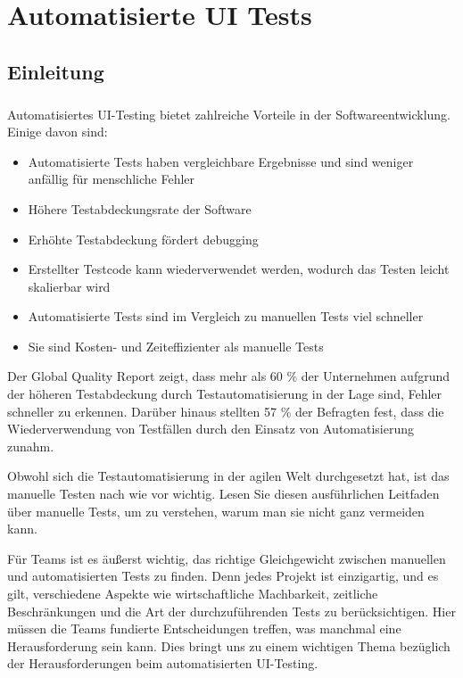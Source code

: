 \chapter{Automatisierte UI Tests}
	\section{Einleitung}  %
		\paragraph{} Automatisiertes UI-Testing bietet zahlreiche Vorteile in der Softwareentwicklung. Einige davon sind:
		
		\begin{itemize}
			\item Automatisierte Tests haben vergleichbare Ergebnisse und sind weniger anfällig für menschliche Fehler
			\item Höhere Testabdeckungsrate der Software
			\item Erhöhte Testabdeckung fördert debugging
			\item Erstellter Testcode kann wiederverwendet werden, wodurch das Testen leicht skalierbar wird
			\item Automatisierte Tests sind im Vergleich zu manuellen Tests viel schneller
			\item Sie sind Kosten- und Zeiteffizienter als manuelle Tests
		\end{itemize}		
		
		Der Global Quality Report zeigt, dass mehr als 60 \% der Unternehmen aufgrund der höheren Testabdeckung durch Testautomatisierung in der Lage sind, Fehler schneller zu erkennen. Darüber hinaus stellten 57 \% der Befragten fest, dass die Wiederverwendung von Testfällen durch den Einsatz von Automatisierung zunahm.
		
		Obwohl sich die Testautomatisierung in der agilen Welt durchgesetzt hat, ist das manuelle Testen nach wie vor wichtig. Lesen Sie diesen ausführlichen Leitfaden über manuelle Tests, um zu verstehen, warum man sie nicht ganz vermeiden kann.
		
		Für Teams ist es äußerst wichtig, das richtige Gleichgewicht zwischen manuellen und automatisierten Tests zu finden. Denn jedes Projekt ist einzigartig, und es gilt, verschiedene Aspekte wie wirtschaftliche Machbarkeit, zeitliche Beschränkungen und die Art der durchzuführenden Tests zu berücksichtigen. Hier müssen die Teams fundierte Entscheidungen treffen, was manchmal eine Herausforderung sein kann. Dies bringt uns zu einem wichtigen Thema bezüglich der Herausforderungen beim automatisierten UI-Testing.
		

